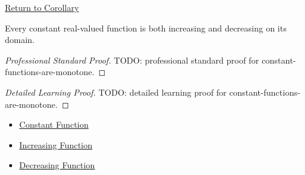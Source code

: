 \newpage
{}
\label{prf:constant-functions-are-monotone}

\begin{remark*}[Return]
\hyperref[cor:constant-functions-are-monotone]{Return to Corollary}
\end{remark*}

\begin{corollary*}
Every constant real-valued function is both increasing and decreasing on its domain.
\end{corollary*}

\begin{proof}[Professional Standard Proof]
\LRAProofBodyStart
TODO: professional standard proof for constant-functions-are-monotone.
\end{proof}

\begin{proof}[Detailed Learning Proof]
\LRAProofBodyStart
TODO: detailed learning proof for constant-functions-are-monotone.
\end{proof}

\begin{remark*}
\end{remark*}

\begin{dependencies}
\begin{itemize}
  \item \hyperref[def:function-constant]{Constant Function}
  \item \hyperref[def:function-increasing]{Increasing Function}
  \item \hyperref[def:function-decreasing]{Decreasing Function}
\end{itemize}
\end{dependencies}

\clearpage
